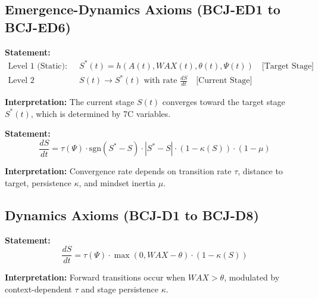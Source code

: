\subsection{Emergence-Dynamics Axioms (BCJ-ED1 to BCJ-ED6)}

\begin{tcolorbox}[colback=gray!5!white, colframe=gray!75!black,
    title=Axiom BCJ-ED1: Two-Level Structure]
\textbf{Statement:}
\begin{align}
\text{Level 1 (Static):} \quad & S^*(t) = h(A(t), WAX(t), \theta(t), \Psi(t)) \quad \text{[Target Stage]} \\
\text{Level 2 (Dynamic):} \quad & S(t) \to S^*(t) \text{ with rate } \frac{dS}{dt} \quad \text{[Current Stage]}
\end{align}

\textbf{Interpretation:} The current stage $S(t)$ converges toward the target stage $S^*(t)$, which is determined by 7C variables.
\end{tcolorbox}

\begin{tcolorbox}[colback=gray!5!white, colframe=gray!75!black,
    title=Axiom BCJ-ED3: Convergence Dynamics]
\textbf{Statement:}
\begin{equation}
\frac{dS}{dt} = \tau(\Psi) \cdot \text{sgn}(S^* - S) \cdot |S^* - S| \cdot (1 - \kappa(S)) \cdot (1 - \mu)
\end{equation}

\textbf{Interpretation:} Convergence rate depends on transition rate $\tau$, distance to target, persistence $\kappa$, and mindset inertia $\mu$.
\end{tcolorbox}

\subsection{Dynamics Axioms (BCJ-D1 to BCJ-D8)}

\begin{tcolorbox}[colback=gray!5!white, colframe=gray!75!black,
    title=Axiom BCJ-D1: Transition Rate]
\textbf{Statement:}
\begin{equation}
\frac{dS}{dt} = \tau(\Psi) \cdot \max(0, WAX - \theta) \cdot (1 - \kappa(S))
\end{equation}

\textbf{Interpretation:} Forward transitions occur when $WAX > \theta$, modulated by context-dependent $\tau$ and stage persistence $\kappa$.
\end{tcolorbox}

